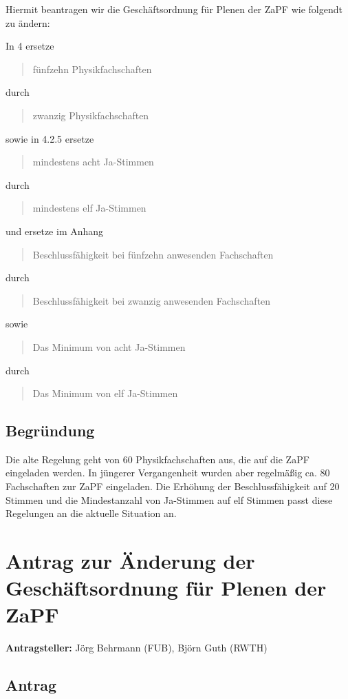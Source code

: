 \documentclass[draft,10pt,oneside]{scrartcl}
\begin{document}
Hiermit beantragen wir die Geschäftsordnung für Plenen der ZaPF wie folgendt zu
ändern:

In 4 ersetze
\begin{quote}
	fünfzehn Physikfachschaften
\end{quote}
durch
\begin{quote}
	zwanzig Physikfachschaften
\end{quote}
sowie in 4.2.5 ersetze
\begin{quote}
	mindestens acht Ja-Stimmen
\end{quote}
durch
\begin{quote}
	mindestens elf Ja-Stimmen
\end{quote}
und ersetze im Anhang
\begin{quote}
	Beschlussfähigkeit bei fünfzehn anwesenden Fachschaften
\end{quote}
durch
\begin{quote}
	Beschlussfähigkeit bei zwanzig anwesenden Fachschaften
\end{quote}
sowie
\begin{quote}
	Das Minimum von acht Ja-Stimmen
\end{quote}
durch
\begin{quote}
	Das Minimum von elf Ja-Stimmen
\end{quote}

\subsection*{Begründung}
Die alte Regelung geht von 60 Physikfachschaften aus, die auf die ZaPF
eingeladen werden. In jüngerer Vergangenheit wurden aber regelmäßig ca. 80
Fachschaften zur ZaPF eingeladen. Die Erhöhung der Beschlussfähigkeit auf 20
Stimmen und die Mindestanzahl von Ja-Stimmen auf elf Stimmen passt diese
Regelungen an die aktuelle Situation an.

\newpage

\section*{Antrag zur Änderung der Geschäftsordnung für Plenen der ZaPF}

\textbf{Antragsteller:} Jörg Behrmann (FUB), Björn Guth (RWTH)

\subsection*{Antrag}
\end{document}
